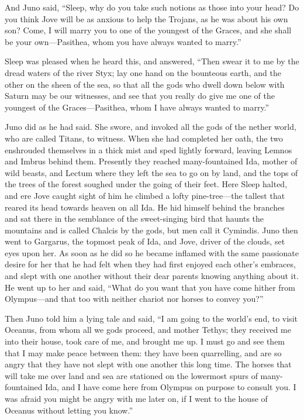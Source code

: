 And Juno said, “Sleep, why do you take such notions as those into your
head? Do you think Jove will be as anxious to help the Trojans, as he was
about his own son? Come, I will marry you to one of the youngest of the
Graces, and she shall be your own—Pasithea, whom you have always
wanted to marry.”

Sleep was pleased when he heard this, and answered, “Then swear it to me
by the dread waters of the river Styx; lay one hand on the bounteous
earth, and the other on the sheen of the sea, so that all the gods who
dwell down below with Saturn may be our witnesses, and see that you really
do give me one of the youngest of the Graces—Pasithea, whom I have
always wanted to marry.”

Juno did as he had said. She swore, and invoked all the gods of the nether
world, who are called Titans, to witness. When she had completed her oath,
the two enshrouded themselves in a thick mist and sped lightly forward,
leaving Lemnos and Imbrus behind them. Presently they reached
many-fountained Ida, mother of wild beasts, and Lectum where they left the
sea to go on by land, and the tops of the trees of the forest soughed
under the going of their feet. Here Sleep halted, and ere Jove caught
sight of him he climbed a lofty pine-tree—the tallest that reared
its head towards heaven on all Ida. He hid himself behind the branches and
sat there in the semblance of the sweet-singing bird that haunts the
mountains and is called Chalcis by the gods, but men call it Cymindis.
Juno then went to Gargarus, the topmost peak of Ida, and Jove, driver of
the clouds, set eyes upon her. As soon as he did so he became inflamed
with the same passionate desire for her that he had felt when they had
first enjoyed each other’s embraces, and slept with one another without
their dear parents knowing anything about it. He went up to her and said,
“What do you want that you have come hither from Olympus—and that
too with neither chariot nor horses to convey you?”

Then Juno told him a lying tale and said, “I am going to the world’s end,
to visit Oceanus, from whom all we gods proceed, and mother Tethys; they
received me into their house, took care of me, and brought me up. I must
go and see them that I may make peace between them: they have been
quarrelling, and are so angry that they have not slept with one another
this long time. The horses that will take me over land and sea are
stationed on the lowermost spurs of many-fountained Ida, and I have come
here from Olympus on purpose to consult you. I was afraid you might be
angry with me later on, if I went to the house of Oceanus without letting
you know.”

